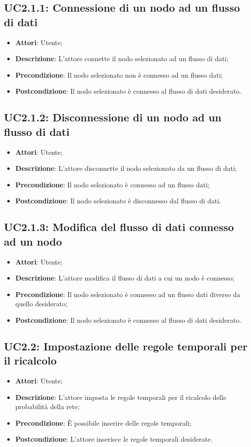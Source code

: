 \subsection{UC2.1.1: Connessione di un nodo ad un flusso di dati}
\begin{itemize}
	\item \textbf{Attori}: Utente;
	\item \textbf{Descrizione}: L'attore connette il nodo selezionato ad un flusso di dati;
	\item \textbf{Precondizione}: Il nodo selezionato non è connesso ad un flusso dati;
	\item \textbf{Postcondizione}: Il nodo selezionato è connesso al flusso di dati desiderato.
\end{itemize}

\subsection{UC2.1.2: Disconnessione di un nodo ad un flusso di dati}
\begin{itemize}
	\item \textbf{Attori}: Utente;
	\item \textbf{Descrizione}: L'attore disconnette il nodo selezionato da un flusso di dati;
	\item \textbf{Precondizione}: Il nodo selezionato è connesso ad un flusso dati;
	\item \textbf{Postcondizione}: Il nodo selezionato è disconnesso dal flusso di dati.
\end{itemize}

\subsection{UC2.1.3: Modifica del flusso di dati connesso ad un nodo}
\begin{itemize}
	\item \textbf{Attori}: Utente;
	\item \textbf{Descrizione}: L'attore modifica il flusso di dati a cui un nodo è connesso;
	\item \textbf{Precondizione}: Il nodo selezionato è connesso ad un flusso dati diverso da quello desiderato;
	\item \textbf{Postcondizione}: Il nodo selezionato è connesso al flusso di dati desiderato.
\end{itemize}
\subsection{UC2.2: Impostazione delle regole temporali per il ricalcolo}
\begin{itemize}
	\item \textbf{Attori}: Utente;
	\item \textbf{Descrizione}: L'attore imposta le regole temporali per il ricalcolo delle probabilità della rete;
	\item \textbf{Precondizione}: È possibile inserire delle regole temporali;
	\item \textbf{Postcondizione}: L'attore inserisce le regole temporali desiderate.
\end{itemize}
